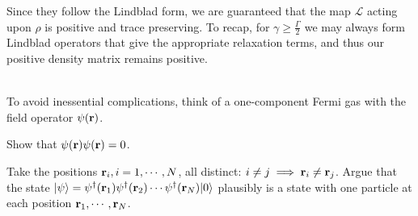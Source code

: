 \documentclass[10pt,letterpaper]{article}
\newcommand{\ra}{\rangle}
\newcommand{\ve}{\textbf }
\begin{document}
Since they follow the Lindblad form, we are guaranteed that the map $\mathcal L$ acting upon $\rho$ is positive and trace preserving. To recap, for $\gamma \ge \frac{\Gamma}{2}$ we may always form Lindblad operators that give the appropriate
relaxation terms, and thus our positive density matrix remains positive. \\ \\
\eenum

\item To avoid inessential complications, think of a one-component Fermi gas with the field operator $\psi(\ve r)$.

\benum

\item Show that $\psi(\ve r)\psi(\ve r)=0$.

\item Take the positions $\ve r_i,i=1,\cdots,N$, all distinct: $i\neq j\implies \ve r_i\neq\ve r_j$. Argue that the state $|\psi\ra=\psi^\dagger(\ve r_1)\psi^\dagger(\ve r_2)\cdots\psi^\dagger(\ve r_N)|0\ra$ plausibly is a state with one particle at each position $\ve r_1, \cdots,\ve r_N$.
\end{document}
